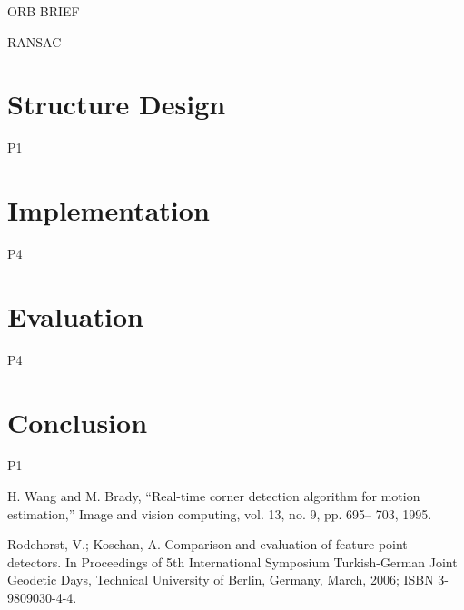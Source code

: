 \documentclass[conference]{IEEEtran}
\begin{document}
ORB BRIEF 

RANSAC



\section{Structure Design}
P1
\section{Implementation}
P4


\section{Evaluation}
P4

\section{Conclusion}
P1


\begin{thebibliography}{00}

 H. Wang and M. Brady, “Real-time corner detection algorithm for
motion estimation,” Image and vision computing, vol. 13, no. 9, pp. 695–
703, 1995.

 Rodehorst, V.; Koschan, A. Comparison and evaluation of feature point detectors. In Proceedings
of 5th International Symposium Turkish-German Joint Geodetic Days, Technical University of
Berlin, Germany, March, 2006; ISBN 3-9809030-4-4.


\end{thebibliography}
\end{document}

